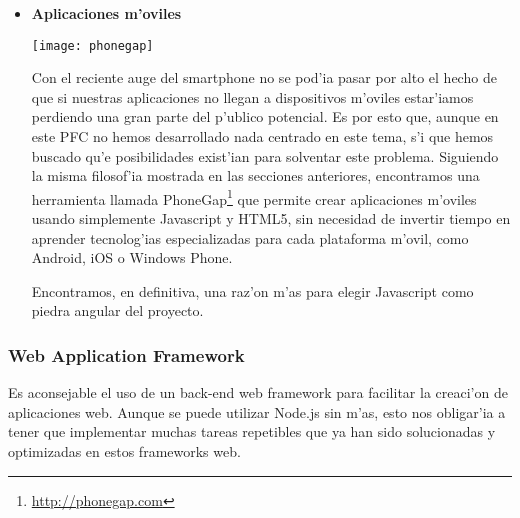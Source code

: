\begin{itemize}
Otro punto a favor de Node.js es su gestor de paquetes NPM\footnote{\url{https://www.npmjs.org}}, con el cual se puede instalar cualquier extensi'on para back-end que exista en el repositorio
de forma r'apida y sencilla. Como se ha mencionado antes, Node.js est'a teniendo un crecimiento extremadamente r'apido, de forma que el n'umero
de m'odulos existentes para esta tecnolog'ia est'a superando a otros gigantes del sector en muy poco tiempo de vida\footnote{\url{http://modulecounts.com/}}.
Pero, sobretodo, lo m'as importante es que el tiempo que se invierte en la programaci'on de front o back-end
tambi'en nos da experiencia en la otra parte, puesto que siempre estamos usando el mismo lenguaje.

\item \textbf{Aplicaciones m'oviles}
\begin{center}
\texttt{[image: phonegap]}
\end{center}

Con el reciente auge del smartphone no se pod'ia pasar por alto el hecho de que si nuestras aplicaciones no llegan a dispositivos m'oviles
estar'iamos perdiendo una gran parte del p'ublico potencial. Es por esto que, aunque en este PFC no hemos desarrollado nada centrado en
este tema, s'i que hemos buscado qu'e posibilidades exist'ian para solventar este problema. Siguiendo la misma filosof'ia mostrada en las
secciones anteriores, encontramos una herramienta llamada PhoneGap\footnote{\url{http://phonegap.com}} que permite crear aplicaciones m'oviles usando simplemente Javascript y
HTML5, sin necesidad de invertir tiempo en aprender tecnolog'ias especializadas para cada plataforma m'ovil, como Android, iOS o Windows Phone.

Encontramos, en definitiva, una raz'on m'as para elegir Javascript como piedra angular del proyecto.


\end{itemize}


\subsubsection[Web Application Framework (FDB)]{Web Application Framework}
\label{sub:web_application_framework}
Es aconsejable el uso de un back-end web framework para facilitar la creaci'on de aplicaciones web. Aunque se puede utilizar Node.js sin m'as,
esto nos obligar'ia a tener que implementar muchas tareas repetibles que ya han sido solucionadas y optimizadas en estos frameworks web.

